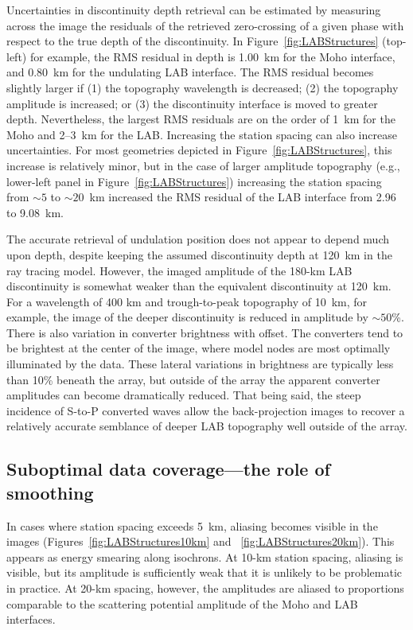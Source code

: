 \documentclass[referee]{gji}
\begin{document}
Uncertainties in discontinuity depth retrieval can be estimated by measuring across the image the residuals of the retrieved zero-crossing of a given phase with respect to the true depth of the discontinuity.  In Figure~\ref{fig:LABStructures} (top-left) for example, the RMS residual in depth is 1.00~km for the Moho interface, and 0.80~km for the undulating LAB interface.  The RMS residual becomes slightly larger if (1) the topography wavelength is decreased; (2) the topography amplitude is increased; or (3) the discontinuity interface is moved to greater depth.  Nevertheless, the largest RMS residuals are on the order of 1~km for the Moho and 2--3~km for the LAB.  Increasing the station spacing can also increase uncertainties.  For most geometries depicted in Figure~\ref{fig:LABStructures}, this increase is relatively minor, but in the case of larger amplitude topography (e.g., lower-left panel in Figure~\ref{fig:LABStructures}) increasing the station spacing from $\sim 5$ to $\sim 20$~km increased the RMS residual of the LAB interface from 2.96 to 9.08~km.

The accurate retrieval of undulation position does not appear to depend much upon depth, despite keeping the assumed discontinuity depth at 120~km in the ray tracing model.  However, the imaged amplitude of the 180-km LAB discontinuity is somewhat weaker than the equivalent discontinuity at 120~km.  For a wavelength of 400 km and trough-to-peak topography of 10~km, for example, the image of the deeper discontinuity is reduced in amplitude by $\sim 50$\%.  There is also variation in converter brightness with offset.  The converters tend to be brightest at the center of the image, where model nodes are most optimally illuminated by the data.  These lateral variations in brightness are typically less than 10\% beneath the array, but outside of the array the apparent converter amplitudes can become dramatically reduced.  That being said, the steep incidence of S-to-P converted waves allow the back-projection images to recover a relatively accurate semblance of deeper LAB topography well outside of the array.

\subsection{Suboptimal data coverage---the role of smoothing}

In cases where station spacing exceeds 5~km, aliasing becomes visible in the images (Figures~\ref{fig:LABStructures10km} and ~\ref{fig:LABStructures20km}).  This appears as energy smearing along isochrons.  At 10-km station spacing, aliasing is visible, but its amplitude is sufficiently weak that it is unlikely to be problematic in practice. At 20-km spacing, however, the amplitudes are aliased to proportions comparable to the scattering potential amplitude of the Moho and LAB interfaces.
\end{document}
